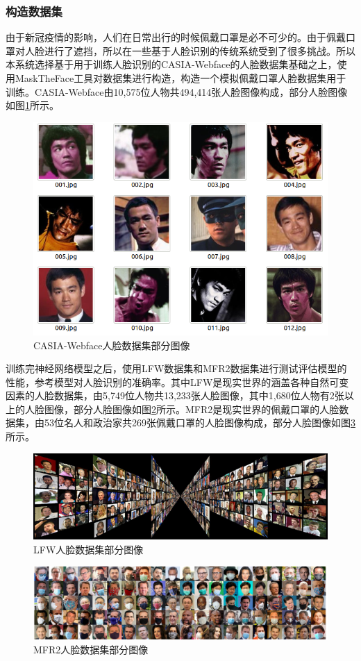 \subsubsection{构造数据集}

由于新冠疫情的影响，人们在日常出行的时候佩戴口罩是必不可少的。由于佩戴口罩对人脸进行了遮挡，所以在一些基于人脸识别的传统系统受到了很多挑战。所以本系统选择基于用于训练人脸识别的CASIA-Webface的人脸数据集基础之上，使用MaskTheFace工具对数据集进行构造，构造一个模拟佩戴口罩人脸数据集用于训练。CASIA-Webface由10,575位人物共494,414张人脸图像构成，部分人脸图像如图\ref{fig:webface}所示。

\begin{figure}[H]
    \centering
    \includegraphics[width=.4\textwidth]{figures/4webface.png}
    \caption{CASIA-Webface人脸数据集部分图像}
    \label{fig:webface}
\end{figure}

训练完神经网络模型之后，使用LFW数据集和MFR2数据集进行测试评估模型的性能，参考模型对人脸识别的准确率。其中LFW是现实世界的涵盖各种自然可变因素的人脸数据集，由5,749位人物共13,233张人脸图像，其中1,680位人物有2张以上的人脸图像，部分人脸图像如图\ref{fig:lfw}所示。MFR2是现实世界的佩戴口罩的人脸数据集，由53位名人和政治家共269张佩戴口罩的人脸图像构成，部分人脸图像如图\ref{fig:mfr2}所示。

\begin{figure}[H]
    \centering
    \includegraphics[width=.75\textwidth]{figures/4lfw.jpg}
    \caption{LFW人脸数据集部分图像}
    \label{fig:lfw}
\end{figure}

\begin{figure}[H]
    \centering
    \includegraphics[width=.75\textwidth]{figures/4mfr2.png}
    \caption{MFR2人脸数据集部分图像}
    \label{fig:mfr2}
\end{figure}

